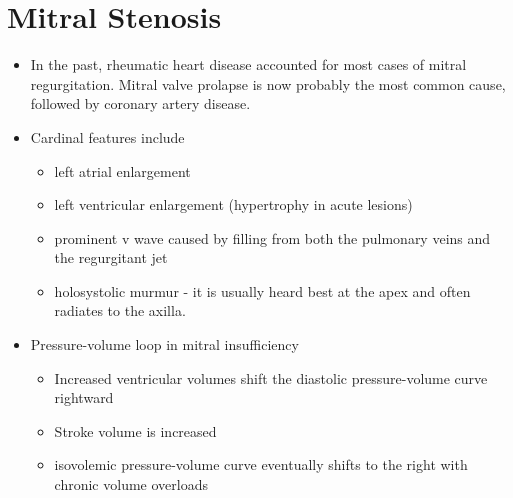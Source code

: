 \documentclass[11pt]{article}
\begin{document}
\section{Mitral Stenosis}
\label{sec:MitralStenosis}
\begin{itemize}
\item In the past, rheumatic heart disease accounted for most cases of mitral regurgitation. Mitral valve prolapse is now probably the most common cause, followed by coronary artery disease.
\item Cardinal features include
  \begin{itemize}
  \item left atrial enlargement
    
  \item left ventricular enlargement (hypertrophy in acute lesions)
  \item prominent v wave caused by filling from both the pulmonary veins
    and the regurgitant jet
  \item holosystolic murmur - it is usually heard best at the apex and often radiates to the axilla.
\end{itemize}

\item Pressure-volume loop in mitral insufficiency
  \begin{itemize}
  \item Increased ventricular volumes shift the diastolic
    pressure-volume curve rightward
  \item Stroke volume is increased
  \item isovolemic pressure-volume curve eventually shifts to the right with chronic volume overloads
\end{itemize}


\end{itemize}
\end{document}

